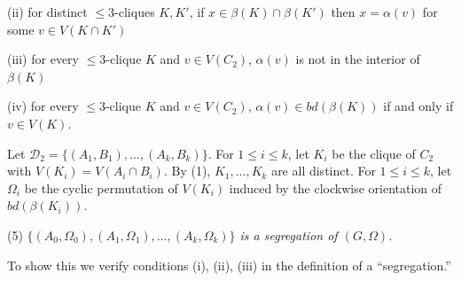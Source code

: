 \hspace*{12pt}(ii) for distinct $\le 3$-cliques $K, K'$, if $x \in \beta(K) \cap \beta(K')$ then $x = \alpha(v)$ for some $v \in V(K \cap K')$

\hspace*{12pt}(iii) for every $\le 3$-clique $K$ and $v \in V(C_2)$, $\alpha(v)$ is not in the interior of $\beta(K)$

\hspace*{12pt}(iv) for every $\le 3$-clique $K$ and $v \in V(C_2)$, $\alpha(v) \in bd(\beta(K))$ if and only if $v \in V(K)$.

Let $\mathcal{D}_2 = \{(A_1, B_1), \dots, (A_k, B_k)\}$. For $1 \le i \le k$, let $K_i$ be the clique of $C_2$ with $V(K_i) = V(A_i \cap B_i)$. By (1), $K_1, \dots, K_k$ are all distinct. For $1 \le i \le k$, let $\Omega_i$ be the cyclic permutation of $V(K_i)$ induced by the clockwise orientation of $bd(\beta(K_i))$.

\hspace*{12pt}(5) \textit{$\{(A_0, \Omega_0), (A_1, \Omega_1), \dots, (A_k, \Omega_k)\}$ is a segregation of $(G, \Omega)$.}

To show this we verify conditions (i), (ii), (iii) in the definition of a ``segregation.''

